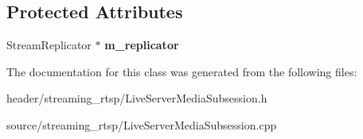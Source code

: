 \subsection*{Protected Attributes}
\begin{DoxyCompactItemize}
\item 
\mbox{\label{class_m_e_s_a_i_1_1_live_server_media_subsession_a99d861c05c88a10fc63d00dd2803d42d}} 
Stream\+Replicator $\ast$ {\bfseries m\+\_\+replicator}
\end{DoxyCompactItemize}


The documentation for this class was generated from the following files\+:\begin{DoxyCompactItemize}
\item 
header/streaming\+\_\+rtsp/Live\+Server\+Media\+Subsession.\+h\item 
source/streaming\+\_\+rtsp/Live\+Server\+Media\+Subsession.\+cpp\end{DoxyCompactItemize}
